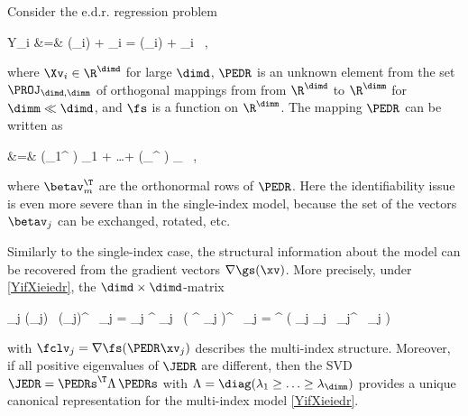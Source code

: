 
%
\label{Smultind}


Consider the e.d.r. regression problem
\begin{EQA}
	Y_{i}
	&=&
	\gs(\Xv_{i}) + \eps_{i}
	=
	\fs(\PEDR \Xv_{i}) + \eps_{i}
	\, ,
\label{YifXieiedr}
\end{EQA}
where \( \Xv_{i} \in \R^{\dimd} \) for large \( \dimd \), 
\( \PEDR \) is an unknown element from the set \( \PROJ_{\dimd,\dimm} \) 
of orthogonal mappings from 
from \( \R^{\dimd} \) to \( \R^{\dimm} \) for \( \dimm \ll \dimd \), and
\( \fs \) is a function on \( \R^{\dimm} \).
The mapping \( \PEDR \) can be written as 
\begin{EQA}
	\PEDR \xv
	&=&
	(\betav_{1}^{\T} \xv) \betav_{1} + \ldots + (\betav_{\dimm}^{\T} \xv) \betav_{\dimm}
	\, ,
\label{ydgenb8jejohkou90tkr}
\end{EQA}
where \( \betav_{m}^{\T} \) are the orthonormal rows of \( \PEDR \).
Here the identifiability issue is even more severe than in the single-index model, because 
the set of the vectors \( \betav_{j} \) can be exchanged, rotated, etc. 

Similarly to the single-index case, 
the structural information about the model
can be recovered from the gradient vectors \( \nabla \gs(\xv) \).
More precisely, under \eqref{YifXieiedr}, the \( \dimd \times \dimd \)-matrix
\begin{EQA}[c]
	\JEDR
	\eqdef
	\sum_{j \in \JJJ} \nabla \gs(\xv_{j}) \, \nabla \gs(\xv_{j})^{\T} \, \neff_{j}
	=
	\sum_{j \in \JJJ} \PEDR^{\T} \fclv_{j} \, \bigl( \PEDR^{\T} \fclv_{j} \bigr)^{\T} \, \neff_{j}
	=
	\PEDR^{\T} \biggl( \sum_{j \in \JJJ} \fclv_{j} \, \fclv_{j}^{\T}  \, \neff_{j} \biggr) \PEDR
	\, 
	\qquad
\label{ihjfiojihfer6t4rrt}
\end{EQA}
with \( \fclv_{j} = \nabla \fs(\PEDR \xv_{j}) \)
describes the multi-index structure.
Moreover, 
if all positive eigenvalues of \( \JEDR \) are different, 
then the SVD \( \JEDR = {\PEDRs}^{\T} \Lambda \, \PEDRs \) with \( \Lambda = \diag(\lambda_{1} \geq \ldots \geq \lambda_{\dimm}) \)
provides a unique canonical representation for the multi-index model \eqref{YifXieiedr}.



